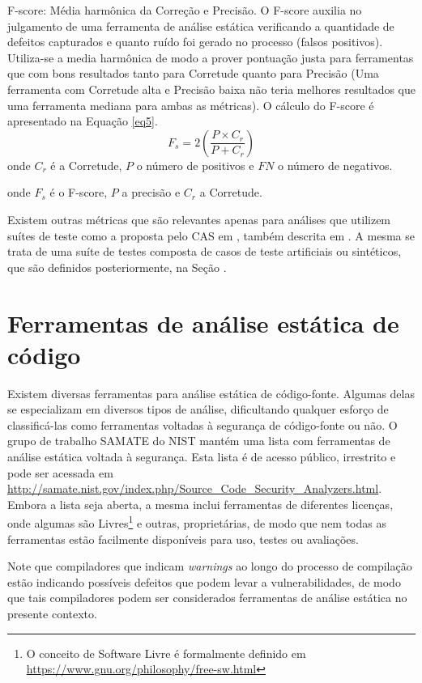   F-score: Média harmônica da Correção e Precisão. O F-score auxilia no julgamento de uma ferramenta de análise estática verificando a quantidade de defeitos capturados e quanto ruído foi gerado no processo (falsos positivos). Utiliza-se a media harmônica de modo a prover pontuação justa para ferramentas que com bons resultados tanto para Corretude quanto para Precisão (Uma ferramenta com Corretude alta e Precisão baixa não teria melhores resultados que uma ferramenta mediana para ambas as métricas). O cálculo do F-score é apresentado na Equação \eqref{eq5}.
\begin{equation}\label{eq5}
  F_s = 2(\frac{P \times C_r}{P + C_r})
\end{equation}
  onde $C_r$ é a Corretude, $P$ o número de positivos e $FN$ o número de negativos.

  onde $F_s$ é o F-score, $P$ a precisão e $C_r$ a Corretude.

  Existem outras métricas que são relevantes apenas para análises que utilizem suítes de teste como a proposta pelo CAS em \cite{nsa}, também descrita em \cite{juliet}. A mesma se trata de uma suíte de testes composta de casos de teste artificiais ou sintéticos, que são definidos posteriormente, na Seção .

  \section{Ferramentas de análise estática de código}

  Existem diversas ferramentas para análise estática de código-fonte. Algumas delas se especializam em diversos tipos de análise, dificultando qualquer esforço de classificá-las como ferramentas voltadas à segurança de código-fonte ou não. O grupo de trabalho SAMATE do  NIST mantém uma lista com ferramentas de análise estática voltada à segurança. Esta lista é de acesso público, irrestrito e pode ser acessada em \url{http://samate.nist.gov/index.php/Source_Code_Security_Analyzers.html}. Embora a lista seja aberta, a mesma inclui ferramentas de diferentes licenças, onde algumas são Livres\footnote{O conceito de Software Livre é formalmente definido em \url{https://www.gnu.org/philosophy/free-sw.html}} e outras, proprietárias, de modo que nem todas as ferramentas estão facilmente disponíveis para uso, testes ou avaliações.

  Note que compiladores que indicam \textit{warnings} ao longo do processo de compilação estão indicando possíveis defeitos que podem levar a vulnerabilidades, de modo que tais compiladores podem ser considerados ferramentas de análise estática no presente contexto.


